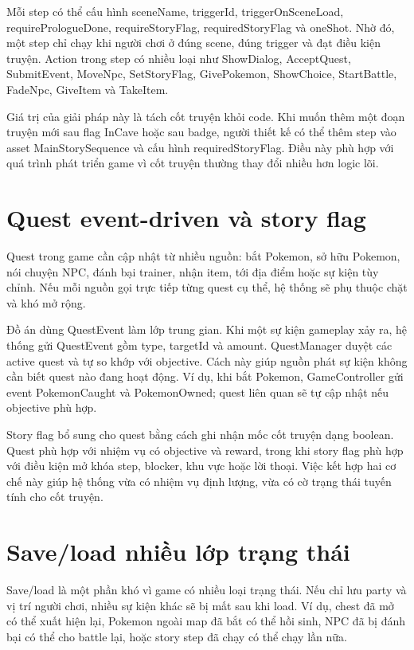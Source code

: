 Mỗi step có thể cấu hình sceneName, triggerId, triggerOnSceneLoad, requirePrologueDone, requireStoryFlag, requiredStoryFlag và oneShot. Nhờ đó, một step chỉ chạy khi người chơi ở đúng scene, đúng trigger và đạt điều kiện truyện. Action trong step có nhiều loại như ShowDialog, AcceptQuest, SubmitEvent, MoveNpc, SetStoryFlag, GivePokemon, ShowChoice, StartBattle, FadeNpc, GiveItem và TakeItem.

Giá trị của giải pháp này là tách cốt truyện khỏi code. Khi muốn thêm một đoạn truyện mới sau flag InCave hoặc sau badge, người thiết kế có thể thêm step vào asset MainStorySequence và cấu hình requiredStoryFlag. Điều này phù hợp với quá trình phát triển game vì cốt truyện thường thay đổi nhiều hơn logic lõi.

\section{Quest event-driven và story flag}

Quest trong game cần cập nhật từ nhiều nguồn: bắt Pokemon, sở hữu Pokemon, nói chuyện NPC, đánh bại trainer, nhận item, tới địa điểm hoặc sự kiện tùy chỉnh. Nếu mỗi nguồn gọi trực tiếp từng quest cụ thể, hệ thống sẽ phụ thuộc chặt và khó mở rộng.

Đồ án dùng QuestEvent làm lớp trung gian. Khi một sự kiện gameplay xảy ra, hệ thống gửi QuestEvent gồm type, targetId và amount. QuestManager duyệt các active quest và tự so khớp với objective. Cách này giúp nguồn phát sự kiện không cần biết quest nào đang hoạt động. Ví dụ, khi bắt Pokemon, GameController gửi event PokemonCaught và PokemonOwned; quest liên quan sẽ tự cập nhật nếu objective phù hợp.

Story flag bổ sung cho quest bằng cách ghi nhận mốc cốt truyện dạng boolean. Quest phù hợp với nhiệm vụ có objective và reward, trong khi story flag phù hợp với điều kiện mở khóa step, blocker, khu vực hoặc lời thoại. Việc kết hợp hai cơ chế này giúp hệ thống vừa có nhiệm vụ định lượng, vừa có cờ trạng thái tuyến tính cho cốt truyện.

\section{Save/load nhiều lớp trạng thái}

Save/load là một phần khó vì game có nhiều loại trạng thái. Nếu chỉ lưu party và vị trí người chơi, nhiều sự kiện khác sẽ bị mất sau khi load. Ví dụ, chest đã mở có thể xuất hiện lại, Pokemon ngoài map đã bắt có thể hồi sinh, NPC đã bị đánh bại có thể cho battle lại, hoặc story step đã chạy có thể chạy lần nữa.

